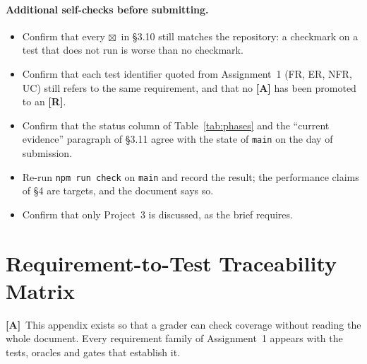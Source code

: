 \documentclass[11pt,a4paper]{article}
\newcommand{\R}{\textcolor{reqc}{\textbf{[R]}}}     %
\newcommand{\A}{\textcolor{asmc}{\textbf{[A]}}}     %
\newcommand{\ct}[1]{\texttt{#1}}
\newcommand{\done}{\textcolor{okc}{$\boxtimes$}}
\begin{document}
\paragraph{Additional self-checks before submitting.}
\begin{itemize}[leftmargin=1.6em,itemsep=2pt]
  \item Confirm that every \done\ in \S3.10 still matches the repository: a checkmark on a
        test that does not run is worse than no checkmark.
  \item Confirm that each test identifier quoted from Assignment~1 (FR, ER, NFR, UC) still
        refers to the same requirement, and that no \A{} has been promoted to an \R{}.
  \item Confirm that the status column of Table~\ref{tab:phases} and the ``current evidence''
        paragraph of \S3.11 agree with the state of \ct{main} on the day of submission.
  \item Re-run \ct{npm run check} on \ct{main} and record the result; the performance claims
        of \S4 are targets, and the document says so.
  \item Confirm that only Project~3 is discussed, as the brief requires.
\end{itemize}

\appendix
\section{Requirement-to-Test Traceability Matrix}

\A\ This appendix exists so that a grader can check coverage without reading the whole
document. Every requirement family of Assignment~1 appears with the tests, oracles and gates
that establish it.
\end{document}
